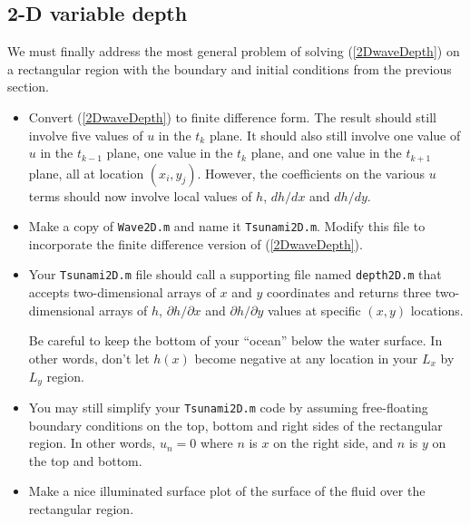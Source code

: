 \documentclass[11pt]{article}
\begin{document}
\subsection{2-D variable depth}
We must finally address the most general problem of solving
(\ref{2DwaveDepth}) on a rectangular region with the boundary
and initial conditions from the previous section.

\begin{itemize}

\item  Convert (\ref{2DwaveDepth}) to finite difference form.
The result should still involve five values of $u$ in the $t_k$ plane.
It should also still involve one value of $u$ in the $t_{k-1}$ plane,
one value in the $t_{k}$ plane,
and one value in the $t_{k+1}$ plane, all at location $(x_i, y_j)$.
However, the coefficients on the various $u$ terms should now
involve local values of $h$, $dh/dx$ and $dh/dy$.

\item Make a copy of {\tt  Wave2D.m} and name it {\tt Tsunami2D.m}.
Modify this file to incorporate the finite difference version of
(\ref{2DwaveDepth}).

\item Your {\tt Tsunami2D.m} file should call a supporting file named
{\tt depth2D.m} that accepts two-dimensional arrays of $x$ and $y$
coordinates and returns three two-dimensional arrays of $h$,
$\partial h/\partial x$ and $\partial h/\partial y$ values at
specific $(x,y)$ locations.

Be careful to keep the bottom of your ``ocean'' below the water
surface. In other words, don't let $h(x)$ become negative at any
location in your $L_x$ by $L_y$ region.

\item You may still simplify your {\tt Tsunami2D.m} code by assuming
free-floating boundary conditions on the top, bottom and right sides
of the rectangular region. In other words, $u_n = 0$ where $n$
is $x$ on the right side, and $n$ is $y$ on the top and bottom.

\item Make a nice illuminated surface plot of the surface of the
fluid over the rectangular region.

\end{itemize}

\end{document}
